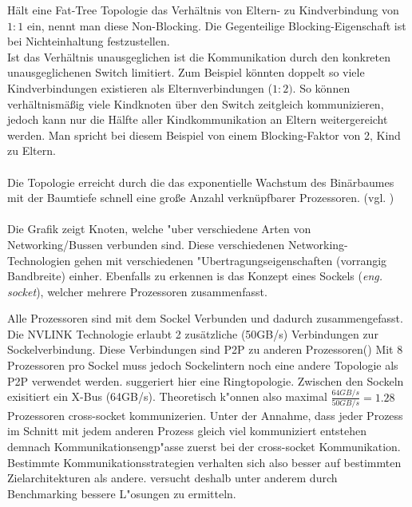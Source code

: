 Hält eine Fat-Tree Topologie das Verhältnis von Eltern- zu Kindverbindung von $1:1$ ein, nennt man diese Non-Blocking. Die Gegenteilige Blocking-Eigenschaft ist bei Nichteinhaltung festzustellen.\\
Ist das Verhältnis unausgeglichen ist die Kommunikation durch den konkreten unausgeglichenen Switch limitiert. Zum Beispiel könnten doppelt so viele Kindverbindungen existieren als Elternverbindungen ($1:2)$. So können verhältnismäßig viele Kindknoten über den Switch zeitgleich kommunizieren, jedoch kann nur die Hälfte aller Kindkommunikation an Eltern weitergereicht werden. Man spricht bei diesem Beispiel von einem Blocking-Faktor von 2, Kind zu Eltern.\\
\\
Die Topologie erreicht durch die das exponentielle Wachstum des Binärbaumes mit der Baumtiefe schnell eine große Anzahl verknüpfbarer Prozessoren. (vgl. \cite{fattree})\\
\\
Die Grafik \cite[Abb.1]{mainpaper} zeigt Knoten, welche "uber verschiedene Arten von Networking/Bussen verbunden sind. Diese verschiedenen Networking-Technologien gehen mit verschiedenen "Ubertragungseigenschaften (vorrangig Bandbreite) einher. Ebenfalls zu erkennen is das Konzept eines Sockels (\textit{eng. socket}), welcher mehrere Prozessoren zusammenfasst. 

Alle Prozessoren sind mit dem Sockel Verbunden und dadurch zusammengefasst.
Die NVLINK Technologie erlaubt 2 zusätzliche (50GB/s) Verbindungen zur Sockelverbindung. Diese Verbindungen sind P2P zu anderen Prozessoren(\cite[FAQ, What is NVLINK?]{osummit})
Mit 8 Prozessoren pro Sockel muss jedoch Sockelintern noch eine andere Topologie als P2P verwendet werden. \cite[Abb. 1]{mainpaper} suggeriert hier eine Ringtopologie.
Zwischen den Sockeln exisitiert ein X-Bus (64GB/s).
Theoretisch k"onnen also maximal $\frac{64GB/s}{50GB/s} = 1.28$ Prozessoren cross-socket kommunizerien. Unter der Annahme, dass jeder Prozess im Schnitt mit jedem anderen Prozess gleich viel kommuniziert  entstehen demnach Kommunikationsengp"asse zuerst bei der cross-socket Kommunikation.\\
Bestimmte Kommunikationsstrategien verhalten sich also besser auf bestimmten Zielarchitekturen als andere.
\cite{mainpaper} versucht deshalb unter anderem durch Benchmarking bessere L"osungen zu ermitteln. 



